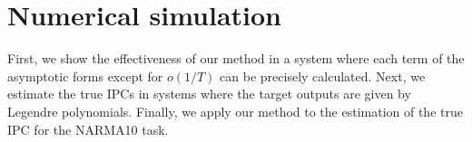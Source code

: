 \documentclass{article}
\begin{document}
\begin{comment}
For instance, suppose the true IPC is $0$, that is, $l_0 = \mu_0$. 
Since the projection is unique, we find that $w_0 = 0$ and $l(w_0; U') = \|\hat{y}(U')\|^2$ and obtain 
\begin{align}
 {\rm Cov}(l(w_0; U'_0), l(w_0; U'_t)) = {\rm Cov}(l(w_0; U'_0), \|\hat{y}(U'_t)\|^2)
 = {\rm Cov}(l(w_0; U'_0), \zeta(U'_t)) = {\rm Cov}(\zeta(U'_0), \zeta(U'_t)), 
\end{align}
which means $V_{l, \infty} = V_{\zeta, \infty} = C_{l, \zeta}$. 
Then, we find that the $O(1/T)$ terms of Eqs.~(\ref{eq:asymp_train_IPC_var}) and (\ref{eq:asymp_test_IPC_var}) are $0$, and asymptotic variance decays faster than $O(1/T)$. 
\end{comment}


\section{Numerical simulation}
\begin{comment}
 ・小さいが厳密に IPC や漸近形の各項を計算できる系で試す。既存手法との比較？
 ・現実的なサイズの RC でルジャンドル多項式の IPC を計算。
 ・NARMA10 で確認。
 ・グラフは平均値に分散のエラーバーを付けたものと、分散自体のグラフも欲しい。
\end{comment}
First, we show the effectiveness of our method in a system where each term of the asymptotic forms except for $o(1/T)$ can be precisely calculated. 
Next, we estimate the true IPCs in systems where the target outputs are given by Legendre polynomials. 
Finally, we apply our method to the estimation of the true IPC for the NARMA10 task.

\begin{comment}
まず厳密に IPC の漸近形の各項を計算できる系で推定法の有効性を確認する。
次にルジャンドル多項式による教師出力で IPC の推定を行い、最後にNARMA10タスクのIPC推定に適用する。
\end{comment}

\begin{comment}
まず厳密に計算できる系で、導出した式を確認する。
隠れノード1つのレザバーで入出力関数は1時刻遅れ入力を用いる。
各 T で n 回試行を行い、平均値と分散を実数と両対数でプロットした。
（平均値・分散のグラフともに、分散のエラーバーを付けておく。また厳密式との比較なので、T, n ともに大きめに取っておく。）
大きい T でほぼ理論通りに 1 / T で下がっているのが分かる。
また訓練 IPC, テスト IPC ともに真の IPC へ 1 / T で漸近する様子もわかる。

次に N = 100 のレザバーでいくつかのルジャンドル多項式の IPC を評価した。
（完全系という指標なので、厳密系と同程度の T, n でよい。）
既存手法と比べて…という点が優れている？
またレザバーのベンチマークとしてよく使われている NARMA10 で IPC の推定も行った。
（おもちゃベンチマークなので、T, n はそこそこに抑えておく。）
直交多項式以外でも機能していることが分かる。
\end{comment}
\end{document}

